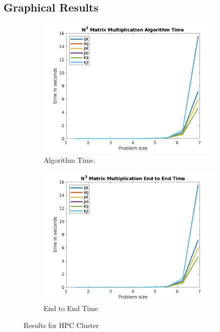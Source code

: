 \documentclass[article, 11pt]{article}
\begin{document}
\subsection{Graphical Results}
\begin{figure}[h]
  \centering
  \begin{subfigure}[b]{0.45\textwidth}
    \includegraphics[width=\textwidth]{Q1_Algo_CLUSTER.png}
    \caption{Algorithm Time.}
    \label{fig:image1}
  \end{subfigure}
  \begin{subfigure}[b]{0.45\textwidth}
    \includegraphics[width=\textwidth]{Q1_EndtoEnd_CLUSTER.png}
    \caption{End to End Time}
    \label{fig:image2}
  \end{subfigure}
  \caption{Results for HPC Cluster}
  \label{fig:entire_figure}
\end{figure}
\end{document}
